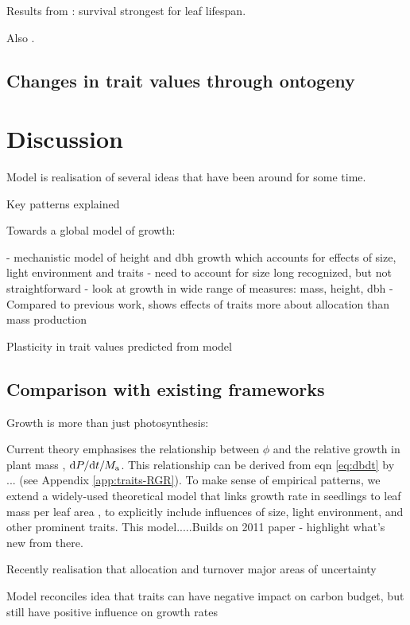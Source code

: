 \documentclass[a4paper,11pt]{article}
\begin{document}
Results from \citet{Poorter-2006}: survival strongest for leaf lifespan.

Also \citep{Baltzer-2007}.

\subsection{Changes in trait values through ontogeny}

\section{Discussion}


Model is realisation of several ideas that have been around for some
time.


Key patterns explained


Towards a global model of growth:

- mechanistic model of height and dbh growth which accounts for effects
  of size, light environment and traits
- need to account for size long recognized, but not straightforward
- look at growth in wide range of measures: mass, height, dbh
- Compared to previous work, shows effects of traits more about
  allocation than mass production

Plasticity in trait values predicted from model

\subsection{Comparison with existing frameworks}

Growth is more than just photosynthesis:

Current theory emphasises the relationship between $\phi$ and the relative growth in plant mass \citep{Lambers-1992, Cornelissen-1996, Wright-2000, Enquist-2007}, ${\rm d}P / {\rm d}t / M_{\rm a}$. This relationship can be derived from eqn \ref{eq:dbdt}  by ... (see Appendix \ref{app:traits-RGR}). To make sense of empirical patterns, we extend a widely-used theoretical model that links growth rate in seedlings to leaf mass per leaf area \citep{Lambers-1992, Wright-2000}, to explicitly include influences of size, light environment, and other prominent traits. This model.....Builds on 2011 paper - highlight what's new from there.

Recently realisation that allocation and turnover major areas of uncertainty

Model reconciles idea that traits can have negative impact on carbon budget, but still have positive influence on growth rates
\end{document}
